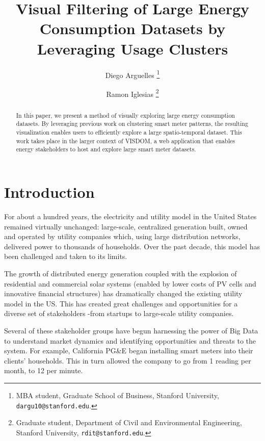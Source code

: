 \documentclass[letterpaper, 12 pt, conference]{ieeeconf}  %
\title{\LARGE \bf Visual Filtering of Large Energy Consumption Datasets by Leveraging Usage Clusters
 }
\author{
 Diego Arguelles%
  \thanks{MBA student, Graduate School of Business, Stanford University, {\tt\small dargu10@stanford.edu}.}
    \and 
    Ramon Iglesias%
  \thanks{Graduate student, Department of Civil and Environmental Engineering, Stanford University, {\tt\small rdit@stanford.edu}.}
 }
\begin{document}
\maketitle

\begin{abstract}
In this paper, we present a method of visually exploring large energy consumption datasets. By leveraging previous work on clustering smart meter patterns, the resulting visualization enables users to efficiently explore a large spatio-temporal dataset. This work takes place in the larger context of VISDOM, a web application that enables energy stakeholders to host and explore large smart meter datasets.
\end{abstract}

\section{Introduction}







For about a hundred years, the electricity and utility model in the United States remained virtually unchanged: large-scale, centralized generation built, owned and operated by utility companies which, using large distribution networks, delivered power to thousands of households. Over the past decade, this model has been challenged and taken to its limits.


The growth of distributed energy generation coupled with the explosion of residential and commercial solar systems (enabled by lower costs of PV cells and innovative financial structures) has dramatically changed the existing utility model in the US. This has created great challenges and opportunities for a diverse set of stakeholders -from startups to large-scale utility companies.


Several of these stakeholder groups have begun harnessing the power of Big Data to understand market dynamics and identifying opportunities and threats to the system. For example, California PG\&E began installing smart meters into their clients’ households. This in turn allowed the company to go from 1 reading per month, to 12 per minute.
\end{document}
